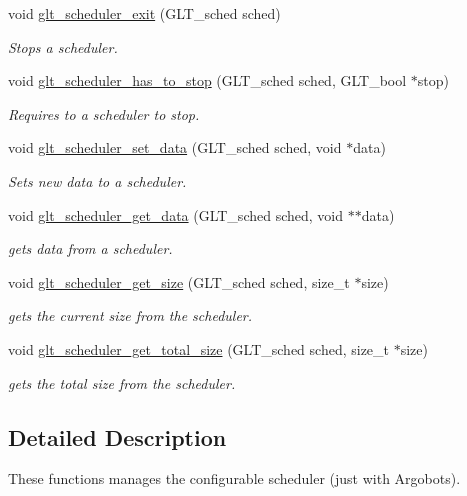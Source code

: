 \begin{DoxyCompactItemize}
void \hyperlink{group__SCHED_ga8df21c40ca28bf29f55cb64ecd077aa7}{glt\-\_\-scheduler\-\_\-exit} (G\-L\-T\-\_\-sched sched)
\begin{DoxyCompactList}\small\item\em Stops a scheduler. \end{DoxyCompactList}\item 
void \hyperlink{group__SCHED_ga526550e59b800d931c26248d8369d950}{glt\-\_\-scheduler\-\_\-has\-\_\-to\-\_\-stop} (G\-L\-T\-\_\-sched sched, G\-L\-T\-\_\-bool $\ast$stop)
\begin{DoxyCompactList}\small\item\em Requires to a scheduler to stop. \end{DoxyCompactList}\item 
void \hyperlink{group__SCHED_ga44dff47dabe465b54837723b50b6da71}{glt\-\_\-scheduler\-\_\-set\-\_\-data} (G\-L\-T\-\_\-sched sched, void $\ast$data)
\begin{DoxyCompactList}\small\item\em Sets new data to a scheduler. \end{DoxyCompactList}\item 
void \hyperlink{group__SCHED_ga1ac411aa00d4a35211ffad154a6cf875}{glt\-\_\-scheduler\-\_\-get\-\_\-data} (G\-L\-T\-\_\-sched sched, void $\ast$$\ast$data)
\begin{DoxyCompactList}\small\item\em gets data from a scheduler. \end{DoxyCompactList}\item 
void \hyperlink{group__SCHED_gabb37915988dae21d910f719f891aea08}{glt\-\_\-scheduler\-\_\-get\-\_\-size} (G\-L\-T\-\_\-sched sched, size\-\_\-t $\ast$size)
\begin{DoxyCompactList}\small\item\em gets the current size from the scheduler. \end{DoxyCompactList}\item 
void \hyperlink{group__SCHED_ga48b98bc3571d3e7374bc5cc85bcf5bc3}{glt\-\_\-scheduler\-\_\-get\-\_\-total\-\_\-size} (G\-L\-T\-\_\-sched sched, size\-\_\-t $\ast$size)
\begin{DoxyCompactList}\small\item\em gets the total size from the scheduler. \end{DoxyCompactList}\end{DoxyCompactItemize}


\subsection{Detailed Description}
These functions manages the configurable scheduler (just with Argobots). 

